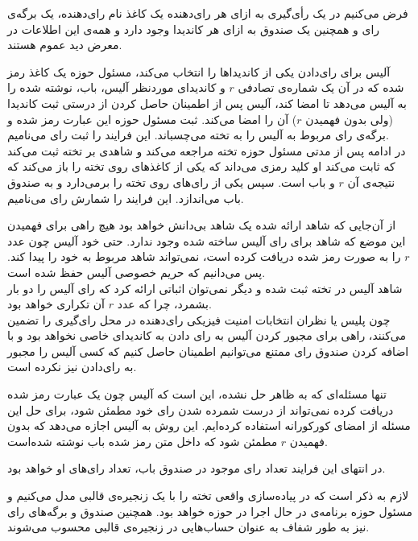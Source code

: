 \par
فرض می‌کنیم در یک رأی‌گیری به ازای هر رای‌دهنده یک کاغذ نام رای‌دهنده، یک برگه‌ی رای و همچنین یک صندوق به ازای هر کاندیدا وجود دارد و همه‌ی این اطلاعات در معرض دید عموم هستند. 
\par
آلیس برای رای‌دادن یکی از کاندیداها را انتخاب می‌کند، مسئول حوزه یک کاغذ رمز شده که در آن یک شماره‌ی تصادفی $r$ و کاندیدای موردنظر آلیس، باب، نوشته شده را به آلیس می‌دهد تا امضا کند، آلیس پس از اطمینان حاصل کردن از درستی ثبت کاندیدا (ولی بدون فهمیدن $r$) آن را امضا می‌کند. ثبت مسئول حوزه این عبارت رمز شده و برگه‌ی رای مربوط به آلیس را به تخته می‌چسباند. این فرایند را ثبت رای‌ می‌نامیم.
\\
در ادامه پس از مدتی مسئول حوزه تخته مراجعه‌ می‌کند و شاهدی بر تخته ثبت می‌کند که ثابت می‌کند او کلید رمزی می‌داند که یکی از کاغذ‌های روی تخته را باز می‌کند که نتیجه‌ی آن $r$ و باب است. سپس یکی از رای‌های روی تخته را برمی‌دارد و به صندوق باب می‌اندازد. این فرایند را شمارش رای‌ می‌نامیم.
\par
از آن‌جایی که شاهد ارائه شده یک شاهد بی‌دانش خواهد بود هیچ راهی برای فهمیدن این موضع که شاهد برای رای آلیس ساخته شده وجود ندارد. حتی خود آلیس چون عدد $r$ را به صورت رمز شده دریافت کرده است، نمی‌تواند شاهد مربوط به خود را پیدا کند. پس می‌دانیم که حریم خصوصی آلیس حفظ شده است. 
\\
 شاهد آلیس در تخته ثبت شده و دیگر نمی‌توان اثباتی ارائه کرد که رای آلیس را دو بار بشمرد، چرا که عدد $r$ آن تکراری خواهد بود.
\\
چون پلیس یا نظران انتخابات امنیت فیزیکی رای‌دهنده در محل رای‌گیری را تضمین می‌کنند، راهی برای مجبور کردن آلیس به رای دادن به کاندیدای خاصی نخواهد بود و با اضافه کردن صندوق رای ممتنع می‌توانیم اطمینان حاصل کنیم که کسی آلیس را مجبور به رای‌دادن نیز نکرده است. 
\par 
تنها مسئله‌ای که به ظاهر حل نشده، این است که آلیس چون یک عبارت رمز شده دریافت کرده نمی‌تواند از درست شمرده شدن رای خود مطمئن شود، برای حل این مسئله از امضای کورکورانه استفاده کرده‌ایم. این روش به آلیس اجازه می‌دهد که بدون فهمیدن $r$ مطمئن شود که داخل متن رمز شده باب نوشته شده‌است. 
\par 
در انتهای این فرایند تعداد رای‌ موجود در صندوق باب، تعداد رای‌های او خواهد بود.
\par 
لازم به ذکر است که در پیاده‌سازی واقعی تخته را با یک زنجیره‌ی قالبی مدل می‌کنیم و مسئول حوزه برنامه‌ی در حال اجرا در حوزه‌ خواهد بود. همچنین صندوق و برگه‌ها‌ی رای نیز به طور شفاف به عنوان حساب‌هایی در زنجیره‌ی قالبی  محسوب می‌شوند. 


